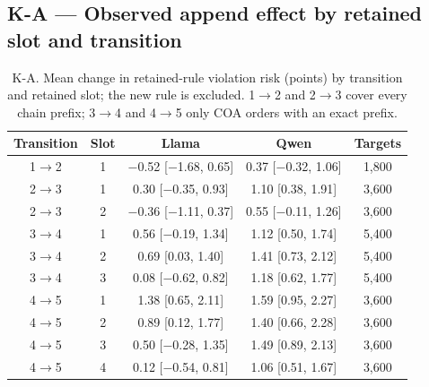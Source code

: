 \subsection*{K-A --- Observed append effect by retained slot and transition}
\begin{table}[h]
\centering\scriptsize
\caption{K-A. Mean change in retained-rule violation risk (points) by transition and retained slot; the new rule is excluded. 1$\to$2 and 2$\to$3 cover every chain prefix; 3$\to$4 and 4$\to$5 only COA orders with an exact prefix.}
\label{tab:KA}
\begin{tabular}{ccccc}
\toprule
Transition & Slot & Llama & Qwen & Targets \\
\midrule
1$\to$2 & 1 & $-$0.52 [$-$1.68, 0.65] & 0.37 [$-$0.32, 1.06] & 1,800 \\
2$\to$3 & 1 & 0.30 [$-$0.35, 0.93] & 1.10 [0.38, 1.91] & 3,600 \\
2$\to$3 & 2 & $-$0.36 [$-$1.11, 0.37] & 0.55 [$-$0.11, 1.26] & 3,600 \\
3$\to$4 & 1 & 0.56 [$-$0.19, 1.34] & 1.12 [0.50, 1.74] & 5,400 \\
3$\to$4 & 2 & 0.69 [0.03, 1.40] & 1.41 [0.73, 2.12] & 5,400 \\
3$\to$4 & 3 & 0.08 [$-$0.62, 0.82] & 1.18 [0.62, 1.77] & 5,400 \\
4$\to$5 & 1 & 1.38 [0.65, 2.11] & 1.59 [0.95, 2.27] & 3,600 \\
4$\to$5 & 2 & 0.89 [0.12, 1.77] & 1.40 [0.66, 2.28] & 3,600 \\
4$\to$5 & 3 & 0.50 [$-$0.28, 1.35] & 1.49 [0.89, 2.13] & 3,600 \\
4$\to$5 & 4 & 0.12 [$-$0.54, 0.81] & 1.06 [0.51, 1.67] & 3,600 \\
\bottomrule
\end{tabular}
\end{table}

